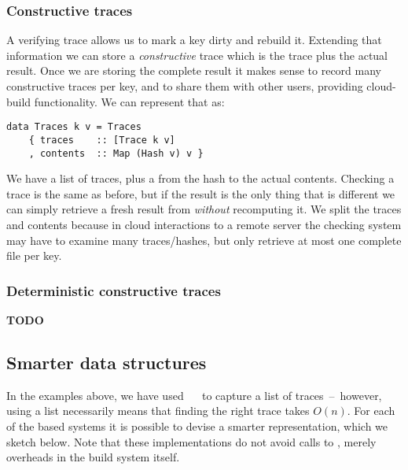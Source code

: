 \subsubsection{Constructive traces}\label{sec-constructive-traces}

A verifying trace allows us to mark a key dirty and rebuild it. Extending that information we can store a \emph{constructive} trace which is the trace plus the actual result. Once we are storing the complete result it makes sense to record many constructive traces per key, and to share them with other users, providing cloud-build functionality. We can represent that as:

\begin{verbatim}
data Traces k v = Traces
    { traces    :: [Trace k v]
    , contents  :: Map (Hash v) v }
\end{verbatim}

We have a list of traces, plus a  from the hash to the actual contents. Checking a trace is the same as before, but if the result is the only thing that is different we can simply retrieve a fresh result from  \emph{without} recomputing it. We split the traces and contents because in cloud interactions to a remote server the checking system may have to examine many traces/hashes, but only retrieve at most one complete file per key.

\subsubsection{Deterministic constructive traces}\label{sec-deterministic-constructive-traces}

\textbf{TODO}

\subsection{Smarter \hs{[Trace]} data structures}\label{sec-smart-traces}

In the examples above, we have used \hs{[Trace}~~\hs{v]} to capture a list
of traces~--~however, using a list necessarily means that finding the right trace
takes $O(n)$. For each of the  based systems it is possible to devise
a smarter representation, which we sketch below. Note that these implementations
do not avoid calls to , merely overheads in the build system itself.

